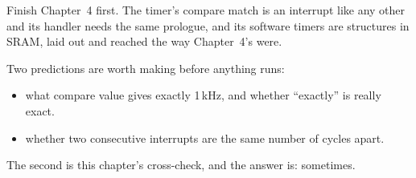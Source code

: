 Finish Chapter~4 first. The timer's compare match is an interrupt like any other and its handler
needs the same prologue, and its software timers are structures in SRAM, laid out and reached the
way Chapter~4's were.

Two predictions are worth making before anything runs:
\begin{itemize}
  \item what compare value gives exactly 1\,kHz, and whether ``exactly'' is really exact.
  \item whether two consecutive interrupts are the same number of cycles apart.
\end{itemize}
The second is this chapter's cross-check, and the answer is: sometimes.







